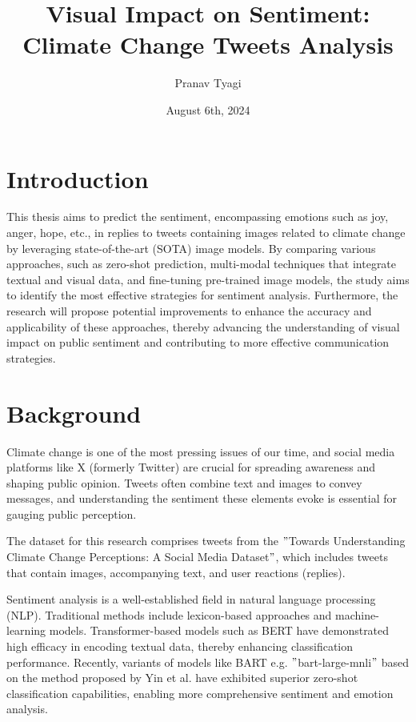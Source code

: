\documentclass[a4paper]{scrartcl}
\title{Visual Impact on Sentiment: Climate Change Tweets Analysis}
\author{Pranav Tyagi}
\date{August 6th, 2024}
\begin{document}
\maketitle

\section{Introduction}\label{sec:introduction}

This thesis aims to predict the sentiment, encompassing emotions such as joy, anger, hope, etc., in replies to tweets containing images related to climate change by leveraging state-of-the-art (SOTA) image models.
By comparing various approaches, such as zero-shot prediction, multi-modal techniques that integrate textual and visual data, and fine-tuning pre-trained image models, the study aims to identify the most effective strategies for sentiment analysis.
Furthermore, the research will propose potential improvements to enhance the accuracy and applicability of these approaches, thereby advancing the understanding of visual impact on public sentiment and contributing to more effective communication strategies.

\section{Background}\label{sec:background}
Climate change is one of the most pressing issues of our time, and social media platforms like X (formerly Twitter) are crucial for spreading awareness and shaping public opinion.
Tweets often combine text and images to convey messages, and understanding the sentiment these elements evoke is essential for gauging public perception.

The dataset for this research comprises tweets from the \("\)Towards Understanding Climate Change Perceptions: A Social Media Dataset\("\)\cite{prasse2023towards}, which includes tweets that contain images, accompanying text, and user reactions (replies).

Sentiment analysis is a well-established field in natural language processing (NLP). Traditional methods include lexicon-based approaches and machine-learning models.
Transformer-based models such as BERT\cite{devlin2019bertpretrainingdeepbidirectional} have demonstrated high efficacy in encoding textual data, thereby enhancing classification performance.
Recently, variants of models like BART\cite{lewis2019bartdenoisingsequencetosequencepretraining} e.g. \("\)bart-large-mnli\("\) based on the method proposed by Yin et al.\cite{yin2019benchmarkingzeroshottextclassification} have exhibited superior zero-shot classification capabilities, enabling more comprehensive sentiment and emotion analysis.
\end{document}
